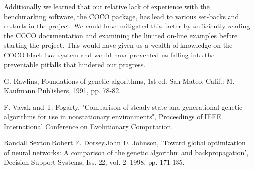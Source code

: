 \documentclass[12pt]{article}
\begin{document}
Additionally we learned that our relative lack of experience with the benchmarking software, the COCO package, has lead to various set-backs and restarts in the project. We could have mitigated this factor by sufficiently reading the COCO documentation and examining the limited on-line examples before starting the project. This would have given us a wealth of knowledge on the COCO black box system and would have prevented us falling into the preventable pitfalls that hindered our progress.


\newpage
\begin{thebibliography}{9}
G. Rawlins, Foundations of genetic algorithms, 1st ed. San Mateo, Calif.: M. Kaufmann Publishers, 1991, pp. 78-82.

F. Vavak and T. Fogarty, "Comparison of steady state and generational genetic algorithms for use in nonstationary environments", Proceedings of IEEE International Conference on Evolutionary Computation.

Randall Sexton,Robert E. Dorsey,John D. Johnson, ‘Toward global optimization of neural networks: A comparison of the genetic algorithm and backpropagation’, Decision Support Systems, Iss. 22, vol. 2, 1998, pp. 171-185.
\end{thebibliography}
\end{document}
